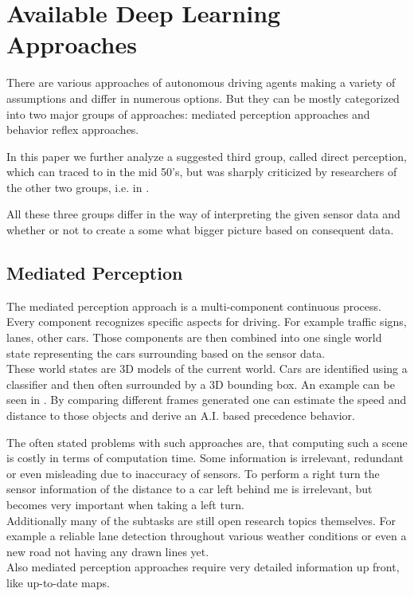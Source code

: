 \section{Available Deep Learning Approaches}\label{sec: Deep Learning Approaches}

There are various approaches of autonomous driving agents making a variety of assumptions and differ in numerous options. But they can be mostly categorized into two major groups of approaches: mediated perception approaches and behavior reflex approaches. \cite{chen2015deepdriving}

In this paper we further analyze a suggested third group, called direct perception, which can traced to \cite{gibson1979ecological} in the mid 50's, but was sharply criticized by researchers of the other two groups, i.e. in \cite{ullman1980against}. %

All these three groups differ in the way of interpreting the given sensor data and whether or not to create a some what bigger picture based on consequent data.

\subsection{Mediated Perception} \label{subsec: Mediated Perception}

The mediated perception approach is a multi-component continuous process. Every component recognizes specific aspects for driving. For example traffic signs, lanes, other cars. Those components are then combined into one single world state representing the cars surrounding based on the sensor data. \cite{KITTI}\\
These world states are 3D models of the current world. Cars are identified using a classifier and then often surrounded by a 3D bounding box. An example can be seen in . By comparing different frames generated one can estimate the speed and distance to those objects and derive an A.I. based precedence behavior. \cite{KITTI}\cite{chen2015deepdriving}

The often stated problems with such approaches are, that computing such a scene is costly in terms of computation time. Some information is irrelevant, redundant or even misleading due to inaccuracy of sensors. To perform a right turn the sensor information of the distance to a car left behind me is irrelevant, but becomes very important when taking a left turn.\\
Additionally many of the subtasks are still open research topics themselves. For example a reliable lane detection throughout various weather conditions or even a new road not having any drawn lines yet. \cite{aly2008real}\\
Also mediated perception approaches require very detailed information up front, like up-to-date maps.

